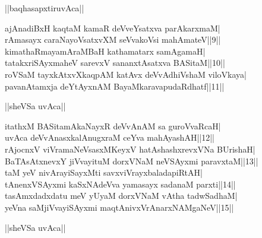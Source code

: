 \documentclass{article}
\begin{document}
\begin{center}
||baqhasapxtiruvAca||
\end{center}

ajAnadiBxH kaqtaM kamaR deVveYsatxva parAkarxmaM|\\
rAmasayx caraNayoVsatxvXM seVvakoVsi mahAmateV||9||\\
kimathaRmayamAraMBaH kathamatarx samAgamaH|\\
tatakxriSAyxmaheV sarevxV sananxtAsatxva BASitaM||10||\\
roVSaM tayxkAtxvXkaqpAM katAvx deVvAdhiVshaM viloVkaya|\\
pavanAtamxja deYtAyxnAM BayaMkaravapudaRdhatf||11||\\

\begin{center}
||sheVSa uvAca||
\end{center}

itathxM BASitamAkaNayxR deVvAnAM sa guroVvaRcaH|\\
uvAca deVvAnasxkalAnugxraM ceYva mahAyashAH||12||\\
rAjocnxV viVramaNeVsasxMKeyxV hatAshashxrevxVNa BUrishaH|\\
BaTAsAtxnevxY jiVvayituM dorxVNaM neVSAyxmi paravxtaM||13||\\
taM yeV nivArayiSayxMti savxviVrayxbaladapiRtAH|\\
tAnenxVSAyxmi kaSxNAdeVva yamasayx sadanaM parxti||14||\\
tasAmxdadxdatu meV yUyaM dorxVNaM vAtha tadwSadhaM|\\
yeVna saMjiVvayiSAyxmi maqtAnivxVrAnarxNAMgaNeV||15||\\

\begin{center}
||sheVSa uvAca||
\end{center}
\end{document}
